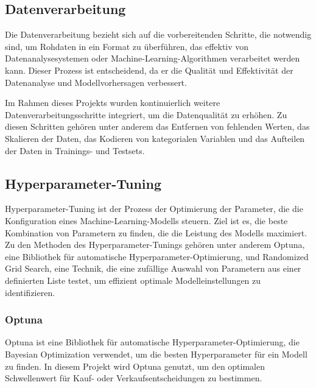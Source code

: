 \subsection{Datenverarbeitung}\label{sec: Data Preprocessing}
Die Datenverarbeitung bezieht sich auf die vorbereitenden Schritte, die notwendig sind, um Rohdaten in ein Format zu überführen, das effektiv von Datenanalysesystemen oder Machine-Learning-Algorithmen verarbeitet werden kann. Dieser Prozess ist entscheidend, da er die Qualität und Effektivität der Datenanalyse und Modellvorhersagen verbessert.

Im Rahmen dieses Projekts wurden kontinuierlich weitere Datenverarbeitungsschritte integriert, um die Datenqualität zu erhöhen. Zu diesen Schritten gehören unter anderem das Entfernen von fehlenden Werten, das Skalieren der Daten, das Kodieren von kategorialen Variablen und das Aufteilen der Daten in Trainings- und Testsets.

\subsection{Hyperparameter-Tuning}\label{sec: Hyperparameter Tuning}
Hyperparameter-Tuning ist der Prozess der Optimierung der Parameter, die die Konfiguration eines Machine-Learning-Modells steuern. Ziel ist es, die beste Kombination von Parametern zu finden, die die Leistung des Modells maximiert. Zu den Methoden des Hyperparameter-Tunings gehören unter anderem Optuna, eine Bibliothek für automatische Hyperparameter-Optimierung, und Randomized Grid Search, eine Technik, die eine zufällige Auswahl von Parametern aus einer definierten Liste testet, um effizient optimale Modelleinstellungen zu identifizieren.

\subsubsection{Optuna}\label{sec: Optuna}
Optuna ist eine Bibliothek für automatische Hyperparameter-Optimierung, die Bayesian Optimization verwendet, um die besten Hyperparameter für ein Modell zu finden. In diesem Projekt wird Optuna genutzt, um den optimalen Schwellenwert für Kauf- oder Verkaufsentscheidungen zu bestimmen.

